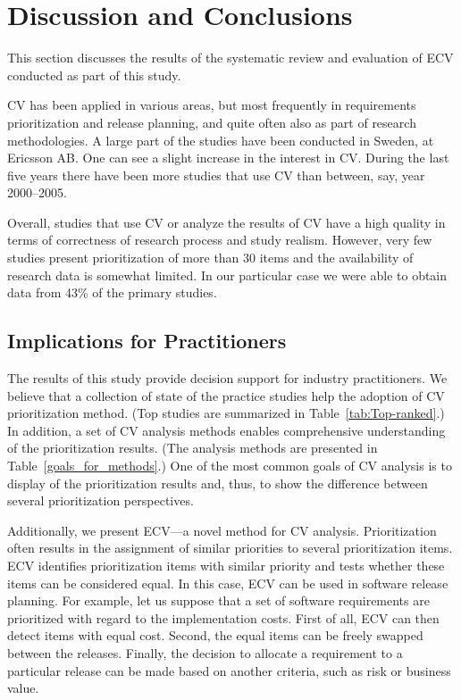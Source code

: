 
\section{Discussion and Conclusions\label{discussion}}
This section discusses the results of the systematic review and evaluation of ECV conducted as part of this study.

CV has been applied in various areas, but most frequently in requirements prioritization and release planning, and quite often also as part of research methodologies.
A large part of the studies have been conducted in Sweden, at Ericsson AB.%
One can see a slight increase in the interest in CV. During the last five years there have been more studies that use CV than between, say, year 2000--2005.

Overall, studies that use CV or analyze the results of CV have a high quality in terms of correctness of research process and study realism.
However, very few studies present prioritization of more than 30 items and the availability of research data is somewhat limited. In our particular case we were able to obtain data from 43\% of the primary studies.

\subsection{Implications for Practitioners}
The results of this study provide decision support for industry practitioners.
We believe that a collection of state of the practice studies help the adoption of CV prioritization method. (Top studies are summarized in Table~\ref{tab:Top-ranked}.)
In addition, a set of CV analysis methods enables comprehensive understanding of the prioritization results. 
(The analysis methods are presented in Table~\ref{goals_for_methods}.)
One of the most common goals of CV analysis is to display of the prioritization results and, thus, to show the difference between several prioritization perspectives.

Additionally, we present ECV---a novel method for CV analysis.
Prioritization often results in the assignment of similar priorities to several prioritization items.
ECV identifies prioritization items with similar priority and tests whether these items can be considered equal.
In this case, ECV can be used in software release planning. For example, let us suppose that a set of software requirements are prioritized with regard to the implementation costs.
First of all, ECV can then detect items with equal cost.
Second, the equal items can be freely swapped between the releases.
Finally, the decision to allocate a requirement to a particular release can be made based on another criteria, such as risk or business value.


